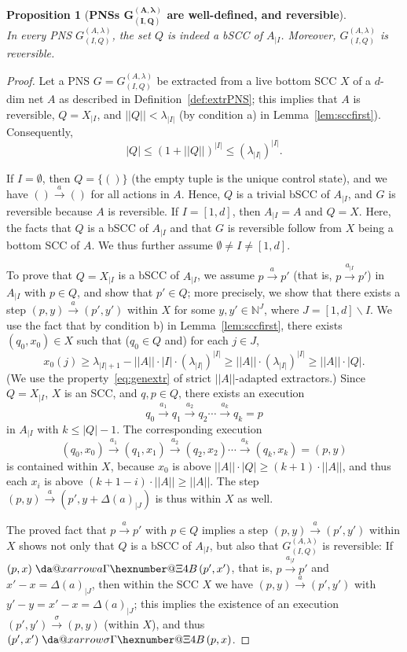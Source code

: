 \documentclass[11pt,a4paper]{amsart}
\makeatletter
\newcommand{\step}[1]{\mathrel{\xrightarrow{#1}}}
\newcommand{\virtual}[1]{\mathrel{\xdashrightarrow{#1}}\hspace{-0.3em}}
\newcommand{\nnorm}[1]{||#1||}
\newcommand{\sizeof}[1]{|#1|}
\newcommand{\Nat}{\mathbb{N}}
\newcommand{\restr}[1]{_{|{#1}}}
\newcommand{\setN}{\Nat}
\newcommand*{\da@rightarrow}{\mathchar"0\hexnumber@\symAMSa 4B }
\newcommand*{\xdashrightarrow}[2][]{%
  \mathrel{%
    \mathpalette{\da@xarrow{#1}{#2}{}\da@rightarrow{\,}{}}{}%
  }%
}
\newcommand*{\da@xarrow}[7]{%
  \sbox0{$\ifx#7\scriptstyle\scriptscriptstyle\else\scriptstyle\fi#5#1#6\m@th$}%
  \sbox2{$\ifx#7\scriptstyle\scriptscriptstyle\else\scriptstyle\fi#5#2#6\m@th$}%
  \sbox4{$#7\dabar@\m@th$}%
  \dimen@=\wd0 %
  \ifdim\wd2 >\dimen@
    \dimen@=\wd2 %
  \fi
  \count@=2 %
  \def\da@bars{\dabar@\dabar@}%
  \@whiledim\count@\wd4<\dimen@\do{%
    \advance\count@\@ne
    \expandafter\def\expandafter\da@bars\expandafter{%
      \da@bars
      \dabar@ 
    }%
  }%
  \mathrel{#3}%
  \mathrel{%
    \mathop{\da@bars}\limits
    \ifx\\#1\\%
    \else
      _{\copy0}%
    \fi
    \ifx\\#2\\%
    \else
      ^{\copy2}%
    \fi
  }%
  \mathrel{#4}%
}
\theoremstyle{plain}
\newtheorem{prop}[thm]{Proposition}
\theoremstyle{definition}
\theoremstyle{defC}
\theoremstyle{thmC}
\makeatother
\begin{document}
\begin{prop}[\textbf{PNSs $\bm{G^{(A,\lambda)}_{(I,Q)}}$ are
	well-defined, and reversible}]\label{prop:condproperPNS}
\hfill \\	
In every PNS ${G^{(A,\lambda)}_{(I,Q)}}$,
	the set ${Q}$ is indeed a
	bSCC of ${A\restr{I}}$. Moreover, ${G^{(A,\lambda)}_{(I,Q)}}$
	is reversible.
\end{prop}	
\begin{proof}
Let a PNS $G={G^{(A,\lambda)}_{(I,Q)}}$ be extracted from a live bottom
	SCC $X$ of a $d$-dim net $A$ as described
	in Definition~\ref{def:extrPNS}; this implies
that $A$ is reversible,	$Q=X\restr{I}$, and $\nnorm{Q}<\lambda_{|I|}$ (by
	condition a) in Lemma~\ref{lem:sccfirst}). Consequently, 
	\[|Q|\leq (1+\nnorm{Q})^{|I|}\leq (\lambda_{|I|})^{|I|}.\]

	If $I=\emptyset$, then $Q=\{()\}$ (the empty tuple is the
	unique
	control state), and we have $()\step{a}()$ for all actions in
	$A$. Hence, $Q$ is a trivial bSCC of $A\restr{I}$, and $G$ is
	reversible because $A$ is reversible.
	If $I=[1,d]$, then $A\restr{I}=A$ and $Q=X$.
	Here, the facts that $Q$ is a bSCC of $A\restr{I}$ and that $G$ is reversible follow from $X$ being a bottom SCC of $A$.
	We thus further assume $\emptyset\neq I\neq[1,d]$.
	
	To prove that  ${Q}=X\restr{I}$ is a bSCC of ${A\restr{I}}$,
we assume $p\step{a}p'$ 
	(that is, $p\step{a\restr{I}}p'$) 
	in $A\restr{I}$ with
	$p\in Q$, and show that $p'\in Q$; more precisely, we show
	that there exists a step 
	$(p,y)\step{a}(p',y')$ within $X$ for some
	$y,y'\in\setN^J$, where $J=[1,d]\smallsetminus I$.
	We use the fact that by condition b) in
	Lemma~\ref{lem:sccfirst}, there exists 
	$(q_0,x_0)\in X$ such that ($q_0\in Q$ and) for each $j\in J$,
	\[
	x_0(j)\geq
		\lambda_{\sizeof{I}+1}-\nnorm{A}\cdot\sizeof{I}\cdot(\lambda_{\sizeof{I}})^{\sizeof{I}}\geq
	\nnorm{A}\cdot (\lambda_{|I|})^{|I|}\geq \nnorm{A}\cdot |Q|.\]
(We use the property~\eqref{eq:genextr} of strict
	$\nnorm{A}$-adapted extractors.)
	Since $Q=X\restr{I}$, $X$ is an SCC, and $q,p\in Q$, there exists an execution 
	\[q_0\step{a_1}q_1\step{a_2}q_2\cdots \step{a_k}q_k=p\] in $A\restr{I}$ 
	with $k\leq |Q|-1$. The corresponding execution
	\[(q_0,x_0)\step{a_1}(q_1,x_1)\step{a_2}(q_2,x_2)\cdots
	\step{a_k}(q_k,x_k)=(p,y)\]
	 is contained within $X$, because $x_0$
	is above $\nnorm{A}\cdot |Q|\geq (k+1)\cdot\nnorm{A}$, and
	thus each $x_i$ is above
	$(k+1-i)\cdot\nnorm{A}\geq\nnorm{A}$.
The step
	$(p,y)\step{a}(p',y+\Delta(a)\restr{J})$ is thus within $X$ as
	well. 

	The proved fact that $p\step{a}p'$ with $p\in Q$ implies  a step $(p,y)\step{a}(p',y')$
	within $X$ shows not only 
	that $Q$ is a bSCC of $A\restr{I}$, but also  
that	${G^{(A,\lambda)}_{(I,Q)}}$ is reversible: 
	If
	$(p,x)\virtual{a}(p',x')$, that is, $p\step{a\restr{I}}p'$ and
	$x'-x=\Delta(a)\restr{J}$, then within the SCC $X$ we have
	$(p,y)\step{a}(p',y')$
	with $y'-y=x'-x=\Delta(a)\restr{J}$; this implies the
	existence of an execution
	$(p',y')\step{\sigma} (p,y)$ (within $X$), and thus
	$(p',x')\virtual{\sigma} (p,x)$.
\end{proof}	
\end{document}
